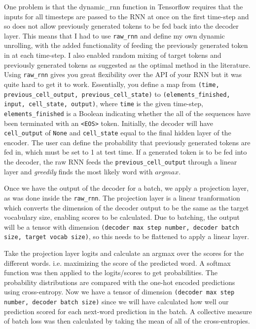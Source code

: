 \documentclass[]{article}
\begin{document}
One problem is that the dynamic\_rnn function in Tensorflow requires that the inputs for all timesteps are passed to the RNN at once on the first time-step and so does not allow previously generated tokens to be fed back into the decoder layer. This means that I had to use \lstinline{raw_rnn} and define my own dynamic unrolling, with the added functionality of feeding the previously generated token in at each time-step. I also enabled random mixing of target tokens and previously generated tokens as suggested as the optimal method in the literature. Using \lstinline{raw_rnn} gives you great flexibility over the API of your RNN but it was quite hard to get it to work. Essentially, you define a map from \lstinline{(time, previous_cell_output, previous_cell_state)}
to \lstinline{(elements_finished, input, cell_state, output)}, where \lstinline{time} is the given time-step, \lstinline{elements_finished} is a Boolean indicating whether the all of the sequences have been terminated with an \lstinline{<EOS>} token. Initially, the decoder will have \lstinline{cell_output} of \lstinline{None} and \lstinline{cell_state} equal to the final hidden layer of the encoder. The user can define the probability that previously generated tokens are fed in, which must be set to 1 at test time. If a generated token is to be fed into the decoder, the raw RNN feeds the \lstinline{previous_cell_output} through a linear layer and \textit{greedily} finds the most likely word with $argmax$.

Once we have the output of the decoder for a batch, we apply a projection layer, as was done inside the \lstinline{raw_rnn}. The projection layer is a linear tranformation which converts the dimension of the decoder output to be the same as the target vocabulary size, enabling scores to be calculated. Due to batching, the output will be a tensor with dimension \lstinline{(decoder max step number, decoder batch size, target vocab size)}, so this needs to be flattened to apply a linear layer.

Take the projection layer logits and calculate an argmax over the scores for the different words. i.e. maximizing the score of the predicted word. A softmax function was then applied to the logits/scores to get probabilities. The probability distributions are compared with the one-hot encoded predictions using cross-entropy. Now we have a tensor of dimension \lstinline{(decoder max step number, decoder batch size)} since we will have calculated how well our prediction scored for each next-word prediction in the batch. A collective measure of batch loss was then calculated by taking the mean of all of the cross-entropies.
\end{document}
